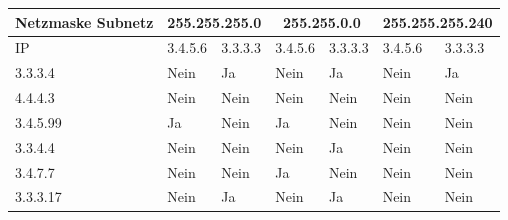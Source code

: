 \begin{myexercise}
\begin{center}
	\end{center}
	\begin{myanswer}
		\begin{table}[H]
			\centering
			\small
			\begin{tabular}{m{2cm}||m{1.5cm}|m{1.5cm}|m{1.5cm}|m{1.5cm}|m{1.5cm}|m{1.7cm}}
				\textbf{Netzmaske Subnetz} & \multicolumn{2}{c|}{255.255.255.0} & \multicolumn{2}{c|}{255.255.0.0} & \multicolumn{2}{c}{255.255.255.240}                               \\
				\midrule
				IP                         & 3.4.5.6                            & 3.3.3.3                          & 3.4.5.6                             & 3.3.3.3 & 3.4.5.6 & 3.3.3.3 \\
				\midrule\midrule
				3.3.3.4                    & Nein                               & Ja                               & Nein                                & Ja      & Nein    & Ja      \\\midrule
				4.4.4.3                    & Nein                               & Nein                             & Nein                                & Nein    & Nein    & Nein    \\\midrule
				3.4.5.99                   & Ja                                 & Nein                             & Ja                                  & Nein    & Nein    & Nein    \\\midrule
				3.3.4.4                    & Nein                               & Nein                             & Nein                                & Ja      & Nein    & Nein    \\\midrule
				3.4.7.7                    & Nein                               & Nein                             & Ja                                  & Nein    & Nein    & Nein    \\\midrule
				3.3.3.17                   & Nein                               & Ja                               & Nein                                & Ja      & Nein    & Nein    \\
			\end{tabular}
		\end{table}
	\end{myanswer}
\end{myexercise}


